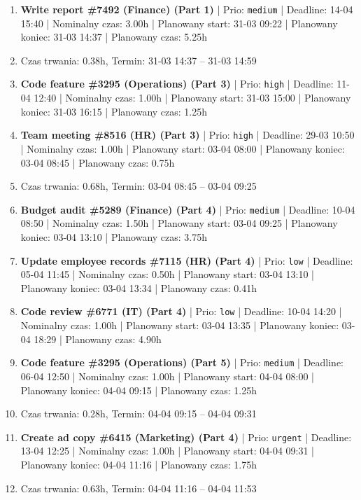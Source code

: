 {\begin{enumerate}
  \item [\textbf{14642}] \textbf{Write report \#7492 (Finance) (Part 1)} | Prio: \texttt{medium} | Deadline: 14-04 15:40 | Nominalny czas: 3.00h | Planowany start: 31-03 09:22 | Planowany koniec: 31-03 14:37 | Planowany czas: 5.25h
  \item [\textbf{PRZERWA}] Czas trwania: 0.38h, Termin: 31-03 14:37 -- 31-03 14:59
  \item [\textbf{14608}] \textbf{Code feature \#3295 (Operations) (Part 3)} | Prio: \texttt{high} | Deadline: 11-04 12:40 | Nominalny czas: 1.00h | Planowany start: 31-03 15:00 | Planowany koniec: 31-03 16:15 | Planowany czas: 1.25h
  \item [\textbf{14624}] \textbf{Team meeting \#8516 (HR) (Part 3)} | Prio: \texttt{high} | Deadline: 29-03 10:50 | Nominalny czas: 1.00h | Planowany start: 03-04 08:00 | Planowany koniec: 03-04 08:45 | Planowany czas: 0.75h
  \item [\textbf{PRZERWA}] Czas trwania: 0.68h, Termin: 03-04 08:45 -- 03-04 09:25
  \item [\textbf{14630}] \textbf{Budget audit \#5289 (Finance) (Part 4)} | Prio: \texttt{medium} | Deadline: 10-04 08:50 | Nominalny czas: 1.50h | Planowany start: 03-04 09:25 | Planowany koniec: 03-04 13:10 | Planowany czas: 3.75h
  \item [\textbf{14701}] \textbf{Update employee records \#7115 (HR) (Part 4)} | Prio: \texttt{low} | Deadline: 05-04 11:45 | Nominalny czas: 0.50h | Planowany start: 03-04 13:10 | Planowany koniec: 03-04 13:34 | Planowany czas: 0.41h
  \item [\textbf{14681}] \textbf{Code review \#6771 (IT) (Part 4)} | Prio: \texttt{low} | Deadline: 10-04 14:20 | Nominalny czas: 1.00h | Planowany start: 03-04 13:35 | Planowany koniec: 03-04 18:29 | Planowany czas: 4.90h
  \item [\textbf{14645}] \textbf{Code feature \#3295 (Operations) (Part 5)} | Prio: \texttt{medium} | Deadline: 06-04 12:50 | Nominalny czas: 1.00h | Planowany start: 04-04 08:00 | Planowany koniec: 04-04 09:15 | Planowany czas: 1.25h
  \item [\textbf{PRZERWA}] Czas trwania: 0.28h, Termin: 04-04 09:15 -- 04-04 09:31
  \item [\textbf{14602}] \textbf{Create ad copy \#6415 (Marketing) (Part 4)} | Prio: \texttt{urgent} | Deadline: 13-04 12:25 | Nominalny czas: 1.00h | Planowany start: 04-04 09:31 | Planowany koniec: 04-04 11:16 | Planowany czas: 1.75h
  \item [\textbf{PRZERWA}] Czas trwania: 0.63h, Termin: 04-04 11:16 -- 04-04 11:53

\end{enumerate}}
